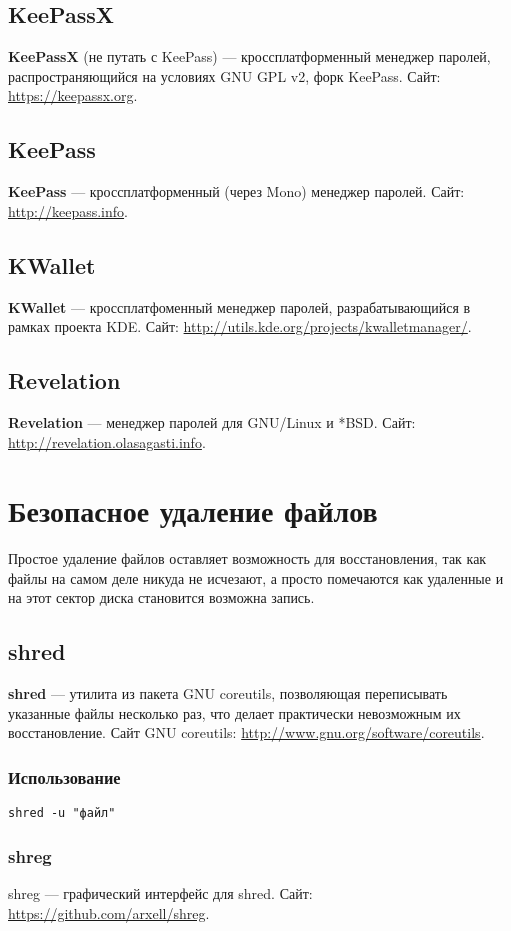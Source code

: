 \begin{enumerate}
\subsection{KeePassX}
\textbf{KeePassX} (не путать с KeePass) --- кроссплатформенный менеджер паролей, распространяющийся на условиях GNU GPL v2, форк KeePass. Сайт: \url{https://keepassx.org}.
\subsection{KeePass}
\textbf{KeePass} --- кроссплатформенный (через Mono) менеджер паролей. Сайт: \url{http://keepass.info}.
\subsection{KWallet}
\textbf{KWallet} --- кроссплатфоменный менеджер паролей, разрабатывающийся в рамках проекта KDE. Сайт: \url{http://utils.kde.org/projects/kwalletmanager/}.
\subsection{Revelation}
\textbf{Revelation} --- менеджер паролей для GNU/Linux и *BSD. Сайт: \url{http://revelation.olasagasti.info}.

\section{Безопасное удаление файлов}
\begin{important}
Простое удаление файлов оставляет возможность для восстановления, так как файлы на самом деле никуда не исчезают, а просто помечаются как удаленные и на этот сектор диска становится возможна запись.
\end{important}
\subsection{shred}
\textbf{shred} --- утилита из пакета GNU coreutils, позволяющая переписывать указанные файлы несколько раз, что делает практически невозможным их восстановление. Сайт GNU coreutils: \url{http://www.gnu.org/software/coreutils}.
\subsubsection{Использование}
\begin{lstlisting}
shred -u "файл"
\end{lstlisting}
\subsubsection{shreg}
shreg --- графический интерфейс для shred. Сайт: \url{https://github.com/arxell/shreg}.

\end{enumerate}
